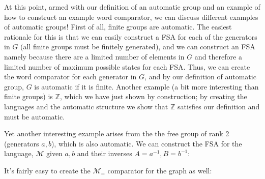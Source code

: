 \documentclass[12pt]{amsart}
\newcommand\Z{\mathbb Z}
\begin{document}
At this point, armed with our definition of an automatic group and an example of how to construct an example word comparator, we can discuss different examples of automatic groups! First of all, finite groups are automatic. The easiest rationale for this is that we can easily construct a FSA for each of the generators in $G$ (all finite groups must be finitely generated), and we can construct an FSA namely because there are a limited number of elements in $G$ and therefore a limited number of maximum possible states for each FSA. Thus, we can create the word comparator for each generator in $G$, and by our definition of automatic group, $G$ is automatic if it is finite. Another example (a bit more interesting than finite groups) is $\Z$, which we have just shown by construction; by creating the languages and the automatic structure we show that $\Z$ satisfies our definition and must be automatic. 

Yet another interesting example arises from the the free group of rank 2 (generators $a,b$), which is also automatic. We can construct the FSA for the language, $\mathcal{M}$ given $a,b$ and their inverses $A=a^{-1},B=b^{-1}$: 

\begin{center}
\end{center}

It's fairly easy to create the $\mathcal{M}_=$ comparator for the graph as well:
\end{document}
